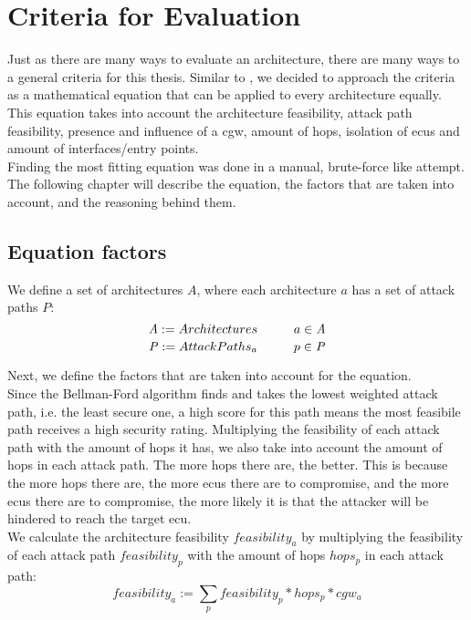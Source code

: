\chapter{Criteria for Evaluation}
\label{chp:criteria}

Just as there are many ways to evaluate an architecture, there are many ways to a general criteria for this thesis.
Similar to \cite{threat_surf}, we decided to approach the criteria as a mathematical equation that can be applied to every architecture equally.
This equation takes into account the architecture feasibility, attack path feasibility, presence and influence of a \acrshort{cgw},
amount of hops, isolation of \acrshort{ecu}s and amount of interfaces/entry points.\\

Finding the most fitting equation was done in a manual, brute-force like attempt.
The following chapter will describe the equation, the factors that are taken into account, and the reasoning behind them.\\

\section{Equation factors}
\label{sec:equation_factors}

We define a set of architectures $\mathit{A}$, where each architecture $a$ has a set of attack paths $\mathit{P}$:\\
\begin{equation}
    \mathit{A} := {Architectures} \hspace*{1cm} a \in \mathit{A} \label{eq:architectures}
\end{equation}
\begin{equation}
    \mathit{P} := {Attack Paths_{a}} \hspace*{1cm} p \in \mathit{P} \label{eq:attack_paths}
\end{equation}

\hfill \break

Next, we define the factors that are taken into account for the equation.\\

Since the Bellman-Ford algorithm finds and takes the lowest weighted attack path, i.e. the least secure one, 
a high score for this path means the most feasibile path receives a high security rating.
Multiplying the feasibility of each attack path with the amount of hops it has, we also take into account the amount of hops in each attack path.
The more hops there are, the better.
This is because the more hops there are, the more \acrshort{ecu}s there are to compromise, 
and the more \acrshort{ecu}s there are to compromise, the more likely it is that the attacker will be hindered to reach the target \acrshort{ecu}.\\
We calculate the architecture feasibility $feasibility_{a}$ by multiplying the feasibility of each attack path $feasibility_{p}$ with the amount of hops $hops_{p}$ in each attack path:
\begin{equation}
    feasibility_{a} := \sum_{p} feasibility_{p} * hops_{p} * cgw_{a} \label{eq:feasibility}
\end{equation}

